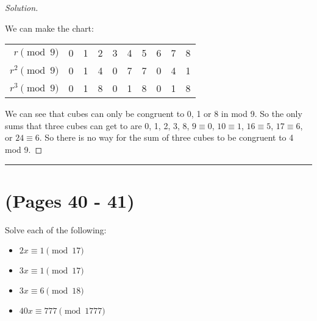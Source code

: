 \documentclass[11pt]{article}
\newcommand{\bline}{\noindent\rule[0.5ex]{\linewidth}{1pt}}
\newenvironment{problem}[2][Problem]{\begin{trivlist}
\item[\hskip \labelsep {\bfseries #1}\hskip \labelsep {\bfseries #2.}]}{\end{trivlist}}
\newenvironment{solution}
  {\renewcommand\qedsymbol{$~$}\begin{proof}[Solution]$ $\par\nobreak\ignorespaces}
  {\end{proof}}
\begin{document}
\begin{solution}
    We can make the chart:

    \setlength{\tabcolsep}{3pt}
    \begin{center}
        \begin{tabular}{r||c|c|c|c|c|c|c|c|c}
            $r    \pmod{9}$    & 0 & 1 & 2 & 3 & 4 & 5 & 6 & 7 & 8 \\
            $r^2     \pmod{9}$ & 0 & 1 & 4 & 0 & 7 & 7 & 0 & 4 & 1 \\
            $r^3     \pmod{9}$ & 0 & 1 & 8 & 0 & 1 & 8 & 0 & 1 & 8 \\
        \end{tabular}
    \end{center}

    We can see that cubes can only be congruent to 0, 1 or 8 in mod 9. So the only sums that three cubes can get to are 0, 1, 2, 3, 8, $9\equiv 0$, $10\equiv 1$, $16\equiv 5$, $17 \equiv 6$, or $24 \equiv 6$. So there is no way for the sum of three cubes to be congruent to 4 mod 9.
\end{solution}

\bline
\section{(Pages 40 - 41)}

\begin{problem}{1}
Solve each of the following:
\begin{itemize}
    \item [(a)] $2x\equiv 1 \pmod{17}$
    \item [(b)] $3x\equiv 1 \pmod{17}$
    \item [(c)] $3x\equiv 6 \pmod{18}$
    \item [(d)] $40x\equiv 777 \pmod{1777}$
\end{itemize}

\end{problem}
\end{document}
